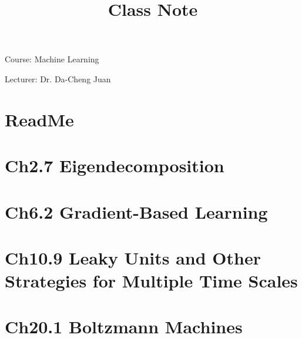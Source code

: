 \documentclass{article}
\begin{document}
\title{Class Note}
\Large{Course: Machine Learning}

\Large{Lecturer: Dr. Da-Cheng Juan}
\section{ReadMe}
\label{ReadMe}

\section{Ch2.7 Eigendecomposition}
\label{Ch2.7}

\section{Ch6.2 Gradient-Based Learning}
\label{Ch6.2}

\section{Ch10.9 Leaky Units and Other Strategies for Multiple Time Scales}
\label{Ch10.9}

\section{Ch20.1 Boltzmann Machines}
\label{Ch20.1}

\end{document}

